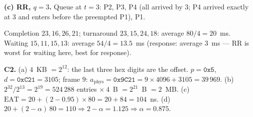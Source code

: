 \documentclass[11pt,a4paper]{article}
\begin{document}
\textbf{(c) RR, $q=3$.} Queue at $t=3$: P2, P3, P4 (all arrived by $3$; P4 arrived exactly at $3$ and enters before the preempted P1), P1.
\begin{center}\end{center}
Completion $23, 16, 26, 21$; turnaround $23, 15, 24, 18$: average $80/4 = 20$~ms. Waiting $15, 11, 15, 13$: average $54/4 = 13.5$~ms (response: average $3$~ms --- RR is worst for waiting here, best for response).

\textbf{C2.} (a) $4$~KB $= 2^{12}$: the last three hex digits are the offset. $p = \texttt{0x5}$, $d = \texttt{0xC21} = 3105$; frame $9$: $a_{\text{phys}} = \texttt{0x9C21} = 9 \times 4096 + 3105 = 39\,969$. (b) $2^{32}/2^{13} = 2^{19} = 524\,288$ entries $\times\ 4$~B $= 2^{21}$~B $= 2$~MB. (c) $\text{EAT} = 20 + (2 - 0.95) \times 80 = 20 + 84 = 104$~ns. (d) $20 + (2-\alpha)\,80 = 110 \Rightarrow 2 - \alpha = 1.125 \Rightarrow \alpha = 0.875$.
\end{document}
